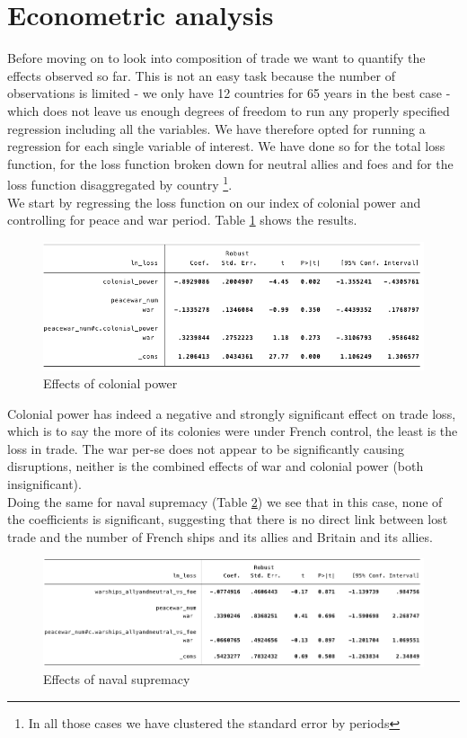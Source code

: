 \documentclass[12pt,a4paper,notitlepage,english]{article}
\begin{document}
\section{Econometric analysis}  \label{economtrics}
Before moving on to look into composition of trade we want to quantify the effects observed so far. This is not an easy task because the number of observations is limited - we only have 12 countries for 65 years in the best case - which does not leave us enough degrees of freedom to run any properly specified regression including all the variables. We have therefore opted for running a regression for each single variable of interest. We have done so for the total loss function, for the loss function broken down for neutral allies and foes and for the loss function disaggregated by country \footnote{In all those cases we have clustered the standard error by periods}. \\
We start by regressing the loss function on our index of colonial power and controlling for peace and war period. Table \ref{effects_colonial_power} shows the results. 
\begin{figure}
\centering
\caption{Effects of colonial power}
\label{effects_colonial_power}
\includegraphics[scale=.65]{reg1}
\end{figure} 
Colonial power has indeed a negative and strongly significant effect on trade loss, which is to say the more of its colonies were under French control, the least is the loss in trade. The war per-se does not appear to be significantly causing disruptions, neither is the combined effects of war and colonial power (both insignificant). \\
Doing the same for naval supremacy (Table \ref{effects_naval_supremacy}) we see that in this case, none of the coefficients is significant, suggesting that there is no direct link between lost trade and the number of French ships and its allies and Britain and its allies. \\
\begin{figure}
\centering
\caption{Effects of naval supremacy}
\label{effects_naval_supremacy}
\includegraphics[scale=.6]{reg2}
\end{figure}
\end{document}
